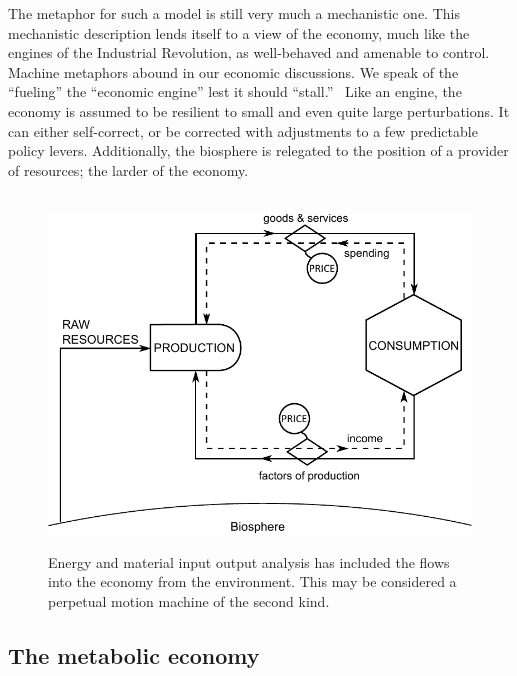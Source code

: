 The metaphor for such a model is still very much
a mechanistic one.
This mechanistic description lends itself to a view of
the economy,
much like the engines of the Industrial Revolution,
as well-behaved and amenable to control.
Machine metaphors abound in our economic discussions.
We speak of the ``fueling'' the ``economic engine'' 
lest it should ``stall.''~\cite{Liu2012}
Like an engine, the economy is  assumed 
to be resilient to small and even quite large perturbations.  
It can either self-correct, 
or be corrected with adjustments to
a few predictable policy levers. 
Additionally, the biosphere is relegated to the position
of a provider of resources;
the larder of the economy.\cite{Norgaard2010}

\begin{figure}[!ht]
\centering\
\includegraphics[width=\linewidth]{Part_0/Chapter_Introduction/images/Perpetual_motion_2.pdf}
\caption[The traditional model supplemented with resource inputs]{Energy 
and material input output analysis has included the flows into the economy from the environment.
This may be considered a perpetual motion machine 
of the second kind.
}
\label{fig:perp_motion_2}
\end{figure}

\subsection{The metabolic economy}
\label{sec:metabolic}

